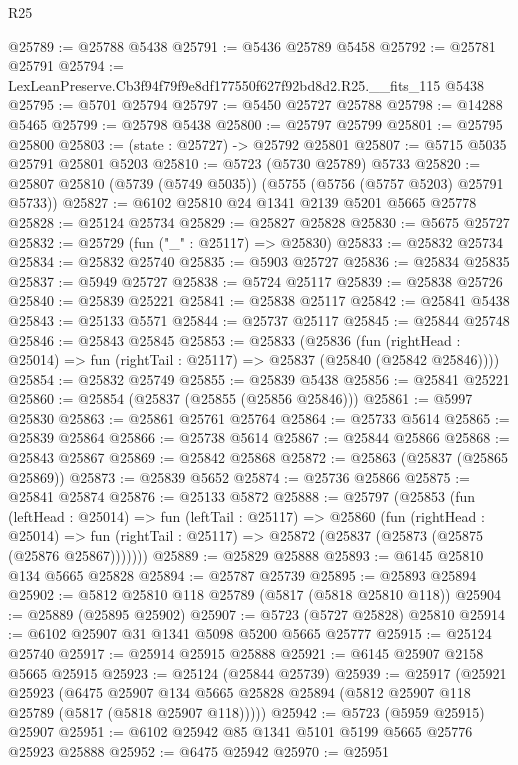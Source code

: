 \begin{lexlean}{R25}
\begin{coremodule}
@25789 := @25788 @5438
@25791 := @5436 @25789 @5458
@25792 := @25781 @25791
@25794 := LexLeanPreserve.Cb3f94f79f9e8df177550f627f92bd8d2.R25.__fits_115 @5438
@25795 := @5701 @25794
@25797 := @5450 @25727 @25788
@25798 := @14288 @5465
@25799 := @25798 @5438
@25800 := @25797 @25799
@25801 := @25795 @25800
@25803 := (state : @25727) -> @25792 @25801
@25807 := @5715 @5035 @25791 @25801 @5203
@25810 := @5723 (@5730 @25789) @5733
@25820 := @25807 @25810 (@5739 (@5749 @5035)) (@5755 (@5756 (@5757 @5203) @25791 @5733))
@25827 := @6102 @25810 @24 @1341 @2139 @5201 @5665 @25778
@25828 := @25124 @25734
@25829 := @25827 @25828
@25830 := @5675 @25727
@25832 := @25729 (fun ("_" : @25117) => @25830)
@25833 := @25832 @25734
@25834 := @25832 @25740
@25835 := @5903 @25727
@25836 := @25834 @25835
@25837 := @5949 @25727
@25838 := @5724 @25117
@25839 := @25838 @25726
@25840 := @25839 @25221
@25841 := @25838 @25117
@25842 := @25841 @5438
@25843 := @25133 @5571
@25844 := @25737 @25117
@25845 := @25844 @25748
@25846 := @25843 @25845
@25853 := @25833
    (@25836
      (fun (rightHead : @25014) => fun (rightTail : @25117) => @25837 (@25840 (@25842 @25846))))
@25854 := @25832 @25749
@25855 := @25839 @5438
@25856 := @25841 @25221
@25860 := @25854 (@25837 (@25855 (@25856 @25846)))
@25861 := @5997 @25830
@25863 := @25861 @25761 @25764
@25864 := @25733 @5614
@25865 := @25839 @25864
@25866 := @25738 @5614
@25867 := @25844 @25866
@25868 := @25843 @25867
@25869 := @25842 @25868
@25872 := @25863 (@25837 (@25865 @25869))
@25873 := @25839 @5652
@25874 := @25736 @25866
@25875 := @25841 @25874
@25876 := @25133 @5872
@25888 := @25797
    (@25853
      (fun (leftHead : @25014) =>
      fun (leftTail : @25117) =>
      @25860
        (fun (rightHead : @25014) =>
        fun (rightTail : @25117) => @25872 (@25837 (@25873 (@25875 (@25876 @25867)))))))
@25889 := @25829 @25888
@25893 := @6145 @25810 @134 @5665 @25828
@25894 := @25787 @25739
@25895 := @25893 @25894
@25902 := @5812 @25810 @118 @25789 (@5817 (@5818 @25810 @118))
@25904 := @25889 (@25895 @25902)
@25907 := @5723 (@5727 @25828) @25810
@25914 := @6102 @25907 @31 @1341 @5098 @5200 @5665 @25777
@25915 := @25124 @25740
@25917 := @25914 @25915 @25888
@25921 := @6145 @25907 @2158 @5665 @25915
@25923 := @25124 (@25844 @25739)
@25939 := @25917
    (@25921
      @25923
      (@6475
        @25907
        @134
        @5665
        @25828
        @25894
        (@5812 @25907 @118 @25789 (@5817 (@5818 @25907 @118)))))
@25942 := @5723 (@5959 @25915) @25907
@25951 := @6102 @25942 @85 @1341 @5101 @5199 @5665 @25776 @25923 @25888
@25952 := @6475 @25942
@25970 := @25951

\end{coremodule}
\end{lexlean}

